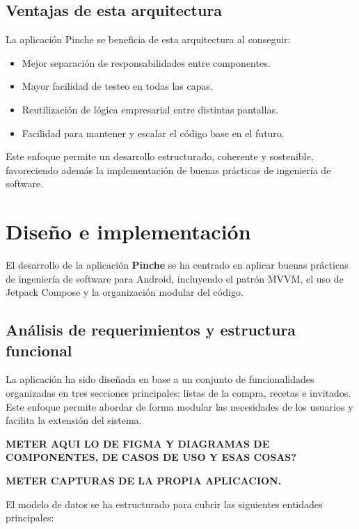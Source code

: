 
\subsection{Ventajas de esta arquitectura}

La aplicación Pinche se beneficia de esta arquitectura al conseguir:

\begin{itemize}
    \item Mejor separación de responsabilidades entre componentes.
    \item Mayor facilidad de testeo en todas las capas.
    \item Reutilización de lógica empresarial entre distintas pantallas.
    \item Facilidad para mantener y escalar el código base en el futuro.
\end{itemize}

Este enfoque permite un desarrollo estructurado, coherente y sostenible, favoreciendo además la implementación de buenas prácticas de ingeniería de software.


\section{Diseño e implementación}
\label{sec:diseno-implementacion}

El desarrollo de la aplicación \textbf{Pinche} se ha centrado en aplicar buenas prácticas de ingeniería de software para Android, incluyendo el patrón MVVM, el uso de Jetpack Compose y la organización modular del código.

\subsection{Análisis de requerimientos y estructura funcional}

La aplicación ha sido diseñada en base a un conjunto de funcionalidades organizadas en tres secciones principales: listas de la compra, recetas e invitados. Este enfoque permite abordar de forma modular las necesidades de los usuarios y facilita la extensión del sistema.

\textbf{METER AQUI LO DE FIGMA Y DIAGRAMAS DE COMPONENTES, DE CASOS DE USO Y ESAS COSAS?}

\textbf{METER CAPTURAS DE LA PROPIA APLICACION.}

El modelo de datos se ha estructurado para cubrir las siguientes entidades principales:

